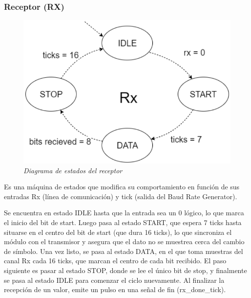 \documentclass[12pt,A4paper,titlepage]{article}
\begin{document}
\subsubsection{Receptor (RX)}
\begin{figure}[H] 
	\centering
	\includegraphics[scale=0.6]{figure/estados_RX.png}
	\caption{\textit{Diagrama de estados del receptor}}
\end{figure}

Es una máquina de estados que modifica su comportamiento en función de sus entradas Rx (línea de comunicación) y tick (salida del Baud Rate Generator). 

Se encuentra en estado IDLE hasta que la entrada sea un 0 lógico, lo que marca el inicio del bit de start. Luego pasa al estado START, que espera 7 ticks hasta situarse en el centro del bit de start (que dura 16 ticks), lo que sincroniza el módulo con el transmisor y asegura que el dato no se muestrea cerca del cambio de símbolo. Una vez listo, se pasa al estado DATA, en el que toma muestras del canal Rx cada 16 ticks, que marcan el centro de cada bit recibido. El paso siguiente es pasar al estado STOP, donde se lee el único bit de stop, y finalmente se pasa al estado IDLE para comenzar el ciclo nuevamente. Al finalizar la recepción de un valor, emite un pulso en una señal de fin (rx\_done\_tick).
\end{document}
